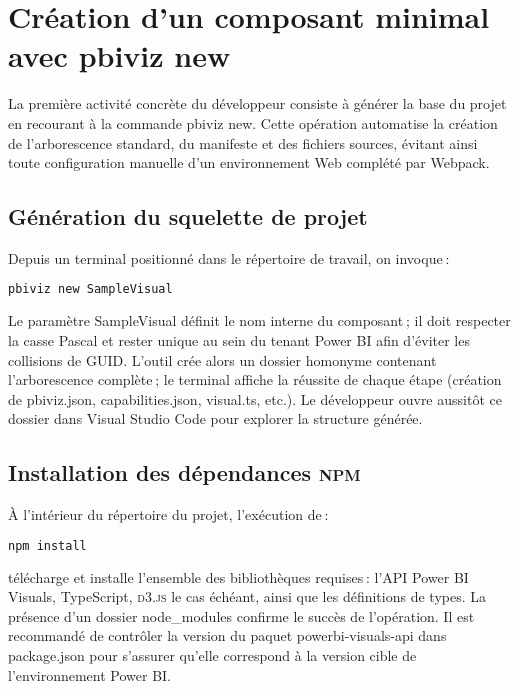 
\section{Création d’un composant minimal avec pbiviz new}\label{sec:ch4_new_visual}

La première activité concrète du développeur consiste à générer la base du projet en recourant à la commande pbiviz new. Cette opération automatise la création de l’arborescence standard, du manifeste et des fichiers sources, évitant ainsi toute configuration manuelle d’un environnement Web complété par Webpack.

\subsection{Génération du squelette de projet}

Depuis un terminal positionné dans le répertoire de travail, on invoque :
\begin{lstlisting}[language=bash]
pbiviz new SampleVisual
\end{lstlisting}
Le paramètre SampleVisual définit le nom interne du composant ; il doit respecter la casse Pascal et rester unique au sein du tenant Power BI afin d’éviter les collisions de GUID. L’outil crée alors un dossier homonyme contenant l’arborescence complète ; le terminal affiche la réussite de chaque étape (création de pbiviz.json, capabilities.json, visual.ts, etc.). Le développeur ouvre aussitôt ce dossier dans Visual Studio Code pour explorer la structure générée.

\subsection{Installation des dépendances \textsc{npm}}

À l’intérieur du répertoire du projet, l’exécution de :
\begin{lstlisting}[language=bash]
npm install
\end{lstlisting}
télécharge et installe l’ensemble des bibliothèques requises : l’API Power BI Visuals, TypeScript, \textsc{d3.js} le cas échéant, ainsi que les définitions de types. La présence d’un dossier node\_modules confirme le succès de l’opération. Il est recommandé de contrôler la version du paquet powerbi-visuals-api dans package.json pour s’assurer qu’elle correspond à la version cible de l’environnement Power BI.

